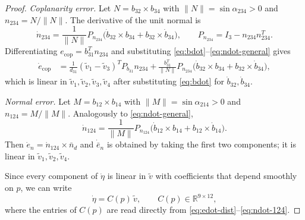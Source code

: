 \begin{proof}
\emph{Coplanarity error.} Let \(N=b_{32}\times b_{34}\) with \(\|N\|=\sin\alpha_{234}>0\) and \(n_{234}=N/\|N\|\). The derivative of the unit normal is
\begin{equation}
\dot n_{234}=\frac{1}{\|N\|}P_{n_{234}}\bigl(\dot b_{32}\times b_{34}+b_{32}\times\dot b_{34}\bigr),
\qquad P_{n_{234}}=I_3-n_{234}n_{234}^{T}.
\label{eq:ndot-general}
\end{equation}
Differentiating \(e_{\mathrm{cop}}=b_{31}^{T}n_{234}\) and substituting \eqref{eq:bdot}--\eqref{eq:ndot-general} gives
\begin{equation}
\begin{aligned}
\dot e_{\mathrm{cop}}
&=\frac{1}{d_{31}}(\tilde v_1-\tilde v_3)^{T}P_{b_{31}}n_{234}
+\frac{b_{31}^{T}}{\|N\|}P_{n_{234}}\bigl(\dot b_{32}\times b_{34}+b_{32}\times\dot b_{34}\bigr),
\end{aligned}
\label{eq:edot-cop}
\end{equation}
which is linear in \(\tilde v_1,\tilde v_2,\tilde v_3,\tilde v_4\) after substituting \eqref{eq:bdot} for \(\dot b_{32},\dot b_{34}\).

\emph{Normal error.} Let \(M=b_{12}\times b_{14}\) with \(\|M\|=\sin\alpha_{214}>0\) and \(n_{124}=M/\|M\|\). Analogously to \eqref{eq:ndot-general},
\begin{equation}
\dot n_{124}=\frac{1}{\|M\|}P_{n_{124}}\bigl(\dot b_{12}\times b_{14}+b_{12}\times\dot b_{14}\bigr).
\label{eq:ndot-124}
\end{equation}
Then \(\dot e_n=\dot n_{124}\times\bar n_d\) and \(\dot{\bar e}_n\) is obtained by taking the first two components; it is linear in \(\tilde v_1,\tilde v_2,\tilde v_4\).

Since every component of \(\dot\eta\) is linear in \(\tilde v\) with coefficients that depend smoothly on \(p\), we can write
\begin{equation}
\boxed{\dot\eta = C(p)\,\tilde v},\qquad
C(p)\in\mathbb R^{9\times 12},
\label{eq:eta-dot}
\end{equation}
where the entries of \(C(p)\) are read directly from \eqref{eq:edot-dist}--\eqref{eq:ndot-124}.


\end{proof}
